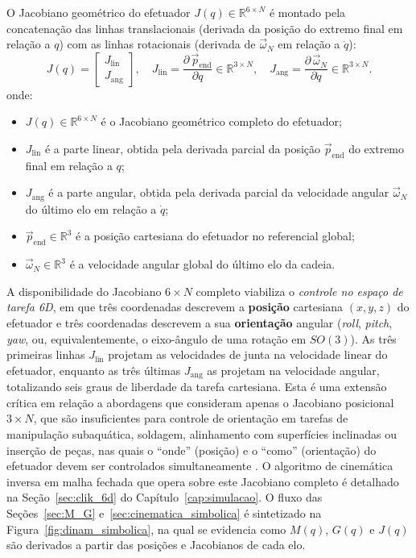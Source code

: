 O Jacobiano geométrico do efetuador $J(q) \in \mathbb{R}^{6 \times N}$ é montado pela concatenação das linhas translacionais (derivada da posição do extremo final em relação a $q$) com as linhas rotacionais (derivada de $\vec{\omega}_N$ em relação a $\dot{q}$):
\begin{equation}
    J(q) = \begin{bmatrix} J_{\text{lin}} \\ J_{\text{ang}} \end{bmatrix}, \quad
    J_{\text{lin}} = \frac{\partial\, \vec{p}_{\text{end}}}{\partial q} \in \mathbb{R}^{3 \times N}, \quad
    J_{\text{ang}} = \frac{\partial\, \vec{\omega}_N}{\partial \dot{q}} \in \mathbb{R}^{3 \times N}.
    \label{eq:jacobian_full}
\end{equation}
onde:
\begin{itemize}
    \item $J(q) \in \mathbb{R}^{6\times N}$ é o Jacobiano geométrico completo do efetuador;
    \item $J_{\text{lin}}$ é a parte linear, obtida pela derivada parcial da posição $\vec{p}_{\text{end}}$ do extremo final em relação a $q$;
    \item $J_{\text{ang}}$ é a parte angular, obtida pela derivada parcial da velocidade angular $\vec{\omega}_N$ do último elo em relação a $\dot{q}$;
    \item $\vec{p}_{\text{end}} \in \mathbb{R}^{3}$ é a posição cartesiana do efetuador no referencial global;
    \item $\vec{\omega}_N \in \mathbb{R}^{3}$ é a velocidade angular global do último elo da cadeia.
\end{itemize}

A disponibilidade do Jacobiano $6 \times N$ completo viabiliza o \emph{controle no espaço de tarefa 6D}, em que três coordenadas descrevem a \textbf{posição} cartesiana $(x, y, z)$ do efetuador e três coordenadas descrevem a sua \textbf{orientação} angular (\textit{roll}, \textit{pitch}, \textit{yaw}, ou, equivalentemente, o eixo-ângulo de uma rotação em $SO(3)$). As três primeiras linhas $J_{\text{lin}}$ projetam as velocidades de junta na velocidade linear do efetuador, enquanto as três últimas $J_{\text{ang}}$ as projetam na velocidade angular, totalizando seis graus de liberdade da tarefa cartesiana. Esta é uma extensão crítica em relação a abordagens que consideram apenas o Jacobiano posicional $3 \times N$, que são insuficientes para controle de orientação em tarefas de manipulação subaquática, soldagem, alinhamento com superfícies inclinadas ou inserção de peças, nas quais o ``onde'' (posição) e o ``como'' (orientação) do efetuador devem ser controlados simultaneamente \cite{chiaverini1997singularity, siciliano2009robotics}. O algoritmo de cinemática inversa em malha fechada que opera sobre este Jacobiano completo é detalhado na Seção~\ref{sec:clik_6d} do Capítulo~\ref{cap:simulacao}. O fluxo das Seções~\ref{sec:M_G} e~\ref{sec:cinematica_simbolica} é sintetizado na Figura~\ref{fig:dinam_simbolica}, na qual se evidencia como $M(q)$, $G(q)$ e $J(q)$ são derivados a partir das posições e Jacobianos de cada elo.

